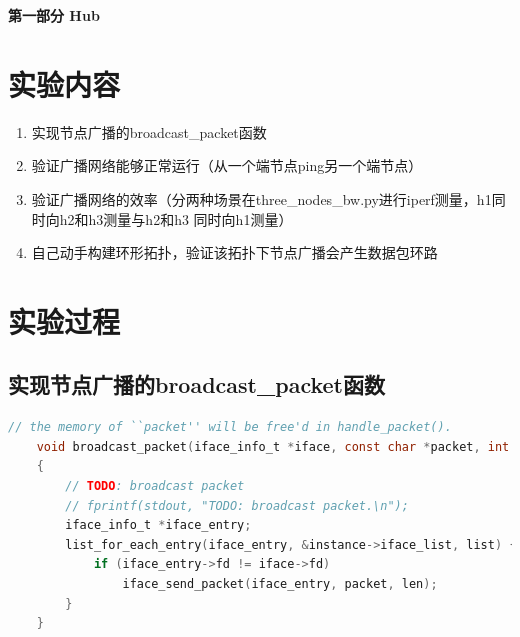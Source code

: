 \documentclass[UTF8]{report}
\begin{document}
\pagestyle{fancy}

\maketitle

\begin{center}
    \Large \bf 第一部分 \quad Hub
\end{center}

\section{实验内容}

\begin{enumerate}
    \item 实现节点广播的broadcast_packet函数
    \item 验证广播网络能够正常运行（从一个端节点ping另一个端节点）
    \item 验证广播网络的效率（分两种场景在three_nodes_bw.py进行iperf测量，h1同时向h2和h3测量与h2和h3 同时向h1测量）
    \item 自己动手构建环形拓扑，验证该拓扑下节点广播会产生数据包环路
\end{enumerate}

\section{实验过程}

\subsection{实现节点广播的broadcast\_packet函数}

\begin{lstlisting}[language=C]
    // the memory of ``packet'' will be free'd in handle_packet().
    void broadcast_packet(iface_info_t *iface, const char *packet, int len)
    {
        // TODO: broadcast packet 
        // fprintf(stdout, "TODO: broadcast packet.\n");
        iface_info_t *iface_entry;
        list_for_each_entry(iface_entry, &instance->iface_list, list) {
            if (iface_entry->fd != iface->fd) 
                iface_send_packet(iface_entry, packet, len);
        }
    }
\end{lstlisting}
\end{document}
